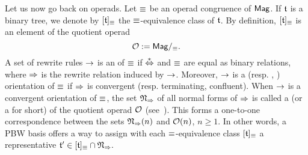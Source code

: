 Let us now go back on operads. Let $\operatorname{\equiv}$ be an operad congruence of
$\mathsf{Mag}$. If $\mathfrak{t}$ is a binary tree, we denote by $[\mathfrak{t}]_{\operatorname{\equiv}}$ the
$\operatorname{\equiv}$-equivalence class of $\mathfrak{t}$. By definition, $[\mathfrak{t}]_{\operatorname{\equiv}}$
is an element of the quotient operad
\begin{equation}
    \mathcal{O} := \mathsf{Mag}/_{\operatorname{\equiv}}.
\end{equation}
A set of rewrite rules $\operatorname{\to}$ is an  of $\operatorname{\equiv}$ if
$\operatorname{\overset{\ast}{\Leftrightarrow}}$ and $\operatorname{\equiv}$ are equal as binary relations, where
$\operatorname{\Rightarrow}$ is the rewrite relation induced by $\operatorname{\to}$. Moreover,
$\operatorname{\to}$ is a  (resp. , )
orientation of $\operatorname{\equiv}$ if $\operatorname{\Rightarrow}$ is convergent (resp.
terminating, confluent). When $\operatorname{\to}$ is a convergent orientation of
$\operatorname{\equiv}$, the set $\mathfrak{N}_{\operatorname{\Rightarrow}}$ of all normal forms of
$\operatorname{\Rightarrow}$ is called a  (or a
 for short) of the quotient operad $\mathcal{O}$
(see~\cite{Hof10,DK10}). This forms a one-to-one correspondence between
the sets $\mathfrak{N}_{\operatorname{\Rightarrow}}(n)$ and $\mathcal{O}(n)$, $n \geq 1$. In
other words, a PBW basis offers a way to assign with each
$\operatorname{\equiv}$-equivalence class $[\mathfrak{t}]_{\operatorname{\equiv}}$ a representative
\begin{math}
    \mathfrak{t}' \in [\mathfrak{t}]_{\operatorname{\equiv}} \cap \mathfrak{N}_{\operatorname{\Rightarrow}}.
\end{math}
\medbreak

